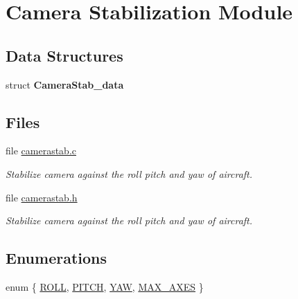 \hypertarget{group___camera_stab}{\section{\-Camera \-Stabilization \-Module}
\label{group___camera_stab}
}
\subsection*{\-Data \-Structures}
\begin{DoxyCompactItemize}
\item 
struct {\bfseries \-Camera\-Stab\-\_\-data}
\end{DoxyCompactItemize}
\subsection*{\-Files}
\begin{DoxyCompactItemize}
\item 
file \hyperlink{camerastab_8c}{camerastab.\-c}
\begin{DoxyCompactList}\small\item\em \-Stabilize camera against the roll pitch and yaw of aircraft. \end{DoxyCompactList}\item 
file \hyperlink{camerastab_8h}{camerastab.\-h}
\begin{DoxyCompactList}\small\item\em \-Stabilize camera against the roll pitch and yaw of aircraft. \end{DoxyCompactList}\end{DoxyCompactItemize}
\subsection*{\-Enumerations}
\begin{DoxyCompactItemize}
\item 
enum \{ \hyperlink{group___camera_stab_gga06fc87d81c62e9abb8790b6e5713c55ba2eeb9fef8a6a516fa6437a44a6efbd52}{\-R\-O\-L\-L}, 
\hyperlink{group___camera_stab_gga06fc87d81c62e9abb8790b6e5713c55baa4ed247aa19723caf868d2b2dd5cf4ff}{\-P\-I\-T\-C\-H}, 
\hyperlink{group___camera_stab_gga06fc87d81c62e9abb8790b6e5713c55ba60ae774ecd1cf97a0e91f76970d64491}{\-Y\-A\-W}, 
\hyperlink{group___camera_stab_gga06fc87d81c62e9abb8790b6e5713c55baaacb851954fab4e8ccf0d09acc8ef697}{\-M\-A\-X\-\_\-\-A\-X\-E\-S}
 \}
\end{DoxyCompactItemize}
